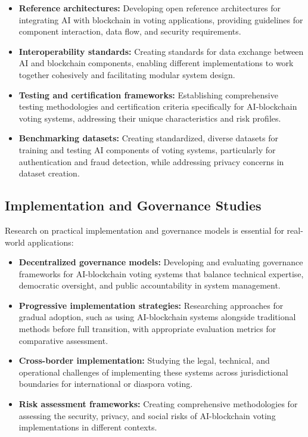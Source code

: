 \documentclass[conference]{IEEEtran}
\begin{document}
\begin{itemize}
    \item \textbf{Reference architectures:} Developing open reference architectures for integrating AI with blockchain in voting applications, providing guidelines for component interaction, data flow, and security requirements.
    
    \item \textbf{Interoperability standards:} Creating standards for data exchange between AI and blockchain components, enabling different implementations to work together cohesively and facilitating modular system design.
    
    \item \textbf{Testing and certification frameworks:} Establishing comprehensive testing methodologies and certification criteria specifically for AI-blockchain voting systems, addressing their unique characteristics and risk profiles.
    
    \item \textbf{Benchmarking datasets:} Creating standardized, diverse datasets for training and testing AI components of voting systems, particularly for authentication and fraud detection, while addressing privacy concerns in dataset creation.
\end{itemize}

\subsection{Implementation and Governance Studies}
Research on practical implementation and governance models is essential for real-world applications:

\begin{itemize}
    \item \textbf{Decentralized governance models:} Developing and evaluating governance frameworks for AI-blockchain voting systems that balance technical expertise, democratic oversight, and public accountability in system management.
    
    \item \textbf{Progressive implementation strategies:} Researching approaches for gradual adoption, such as using AI-blockchain systems alongside traditional methods before full transition, with appropriate evaluation metrics for comparative assessment.
    
    \item \textbf{Cross-border implementation:} Studying the legal, technical, and operational challenges of implementing these systems across jurisdictional boundaries for international or diaspora voting.
    
    \item \textbf{Risk assessment frameworks:} Creating comprehensive methodologies for assessing the security, privacy, and social risks of AI-blockchain voting implementations in different contexts.
\end{itemize}
\end{document}
